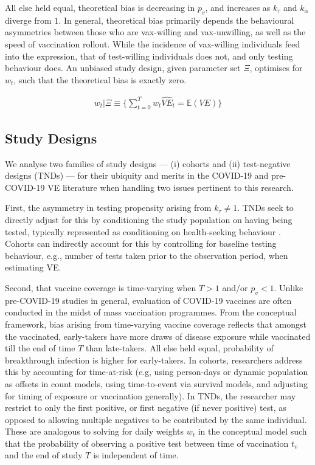 \documentclass[12pt]{article}
\begin{document}
All else held equal, theoretical bias is decreasing in $p_v$, and increases as $k_{\tau}$ and $k_{\alpha}$ diverge from $1$. In general, theoretical bias primarily depends the behavioural asymmetries between those who are vax-willing and vax-unwilling, as well as the speed of vaccination rollout. While the incidence of vax-willing individuals feed into the expression, that of test-willing individuals does not, and only testing behaviour does. An unbiased study design, given parameter set $\Xi$, optimises for $w_t$, such that the theoretical bias is exactly zero.

\begin{eqnarray}
	w_t | \Xi \equiv \{ \sum_{t=0}^{T} w_{t} \hat{VE}_{t} = \mathbb{E}(VE) \}
\end{eqnarray}

\subsection{Study Designs}
We analyse two families of study designs --- (i) cohorts and (ii) test-negative designs (TNDs) --- for their ubiquity and merits in the COVID-19 and pre-COVID-19 VE literature when handling two issues pertinent to this research. 

First, the asymmetry in testing propensity arising from $k_{\tau} \neq 1$. TNDs seek to directly adjust for this by conditioning the study population on having being tested, typically represented as conditioning on health-seeking behaviour \citep{crowcroft2018framework}. Cohorts can indirectly account for this by controlling for baseline testing behaviour, e.g., number of tests taken prior to the observation period, when estimating VE. 

Second, that vaccine coverage is time-varying when $T>1$ and/or $p_v < 1$. Unlike pre-COVID-19 studies in general, evaluation of COVID-19 vaccines are often conducted in the midst of mass vaccination programmes. From the conceptual framework, bias arising from time-varying vaccine coverage reflects that amongst the vaccinated, early-takers have more draws of disease exposure while vaccinated till the end of time $T$ than late-takers. All else held equal, probability of breakthrough infection is higher for early-takers. In cohorts, researchers address this by accounting for time-at-risk (e.g, using person-days or dynamic population as offsets in count models, using time-to-event via survival models, and adjusting for timing of exposure or vaccination generally). In TNDs, the researcher may restrict to only the first positive, or first negative (if never positive) test, as opposed to allowing multiple negatives to be contributed by the same individual. These are analogous to solving for daily weights $w_t$ in the conceptual model such that the probability of observing a positive test between time of vaccination $t_v$ and the end of study $T$ is independent of time.
\end{document}
